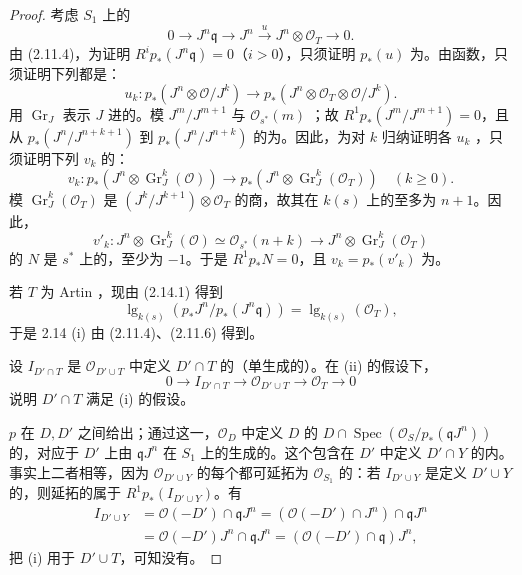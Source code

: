 \begin{proof}
考虑 $S_1$ 上的
\[
0\longrightarrow J^n\mathfrak q\longrightarrow J^n
\xrightarrow{u}J^n\otimes\mathcal O_T\longrightarrow0.\tag{2.14.1}
\]
由 (2.11.4)，为证明 $R^ip_*(J^n\mathfrak q)=0$（$i>0$），只须证明 $p_*(u)$ 为。由函数，只须证明下列都是：
\[
u_k:p_*(J^n\otimes\mathcal O/J^k)\longrightarrow
p_*(J^n\otimes\mathcal O_T\otimes\mathcal O/J^k).
\]
用 $\operatorname{Gr}_J$ 表示 $J$ 进的。模 $J^m/J^{m+1}$ 与 $\mathcal O_{s^*}(m)$ ；故 $R^1p_*(J^m/J^{m+1})=0$，且从 $p_*(J^n/J^{n+k+1})$ 到 $p_*(J^n/J^{n+k})$ 的为。因此，为对 $k$ 归纳证明各 $u_k$ ，只须证明下列 $v_k$ 的：
\[
v_k:p_*(J^n\otimes\operatorname{Gr}_J^k(\mathcal O))
\longrightarrow p_*(J^n\otimes\operatorname{Gr}_J^k(\mathcal O_T))\quad(k\geq0).
\]
模 $\operatorname{Gr}_J^k(\mathcal O_T)$ 是 $(J^k/J^{k+1})\otimes\mathcal O_T$ 的商，故其在 $k(s)$ 上的至多为 $n+1$。因此，
\[
v'_k:J^n\otimes\operatorname{Gr}_J^k(\mathcal O)\simeq\mathcal O_{s^*}(n+k)
\longrightarrow J^n\otimes\operatorname{Gr}_J^k(\mathcal O_T)
\]
的 $N$ 是 $s^*$ 上的，至少为 $-1$。于是 $R^1p_*N=0$，且 $v_k=p_*(v'_k)$ 为。

若 $T$ 为 Artin ，现由 (2.14.1) 得到
\[
\operatorname{lg}_{k(s)}(p_*J^n/p_*(J^n\mathfrak q))
=\operatorname{lg}_{k(s)}(\mathcal O_T),
\]
于是 2.14 (i) 由 (2.11.4)、(2.11.6) 得到。

设 $I_{D'\cap T}$ 是 $\mathcal O_{D'\cup T}$ 中定义 $D'\cap T$ 的（单生成的）。在 (ii) 的假设下，
\[
0\longrightarrow I_{D'\cap T}\longrightarrow\mathcal O_{D'\cup T}
\longrightarrow\mathcal O_T\longrightarrow0
\]
说明 $D'\cap T$ 满足 (i) 的假设。

 $p$ 在 $D,D'$ 之间给出；通过这一，$\mathcal O_D$ 中定义 $D$ 的
$D\cap\operatorname{Spec}(\mathcal O_S/p_*(\mathfrak qJ^n))$ 的，对应于 $D'$ 上由 $\mathfrak qJ^n$ 在 $S_1$ 上的生成的。这个包含在 $D'$ 中定义 $D'\cap Y$ 的内。事实上二者相等，因为 $\mathcal O_{D'\cup Y}$ 的每个都可延拓为 $\mathcal O_{S_1}$ 的：若 $I_{D'\cup Y}$ 是定义 $D'\cup Y$ 的，则延拓的属于 $R^1p_*(I_{D'\cup Y})$。有
\begin{align*}
I_{D'\cup Y}&=\mathcal O(-D')\cap\mathfrak qJ^n
=(\mathcal O(-D')\cap J^n)\cap\mathfrak qJ^n\\
&=\mathcal O(-D')J^n\cap\mathfrak qJ^n
=(\mathcal O(-D')\cap\mathfrak q)J^n,
\end{align*}
把 (i) 用于 $D'\cup T$，可知没有。


\end{proof}
